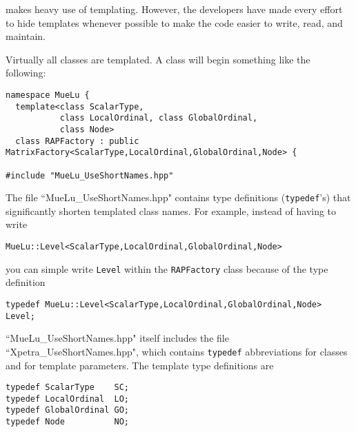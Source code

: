 \muelu makes heavy use of templating.  However, the developers have made every effort to hide templates
whenever possible to make the code easier to write, read, and maintain.

Virtually all \muelu classes are templated.  A class will begin something like the following:

\begin{verbatim}
namespace MueLu {
  template<class ScalarType,
           class LocalOrdinal, class GlobalOrdinal,
           class Node>
  class RAPFactory : public MatrixFactory<ScalarType,LocalOrdinal,GlobalOrdinal,Node> {

#include "MueLu_UseShortNames.hpp"
\end{verbatim}
%
The file ``MueLu\_UseShortNames.hpp" contains type definitions (\verb!typedef!'s) that significantly shorten
templated class names.  For example, instead of having to write
\begin{verbatim}
MueLu::Level<ScalarType,LocalOrdinal,GlobalOrdinal,Node>
\end{verbatim}
you can simple write \verb!Level!  within the \verb!RAPFactory! class because of the type definition
\begin{verbatim}
typedef MueLu::Level<ScalarType,LocalOrdinal,GlobalOrdinal,Node> Level;
\end{verbatim}
``MueLu\_UseShortNames.hpp" itself includes the file ``Xpetra\_UseShortNames.hpp", which contains
\verb!typedef! abbreviations for \xpetra classes and for template parameters.  The template
type definitions are
%
\begin{verbatim}
typedef ScalarType    SC;
typedef LocalOrdinal  LO;
typedef GlobalOrdinal GO;
typedef Node          NO;
\end{verbatim}
